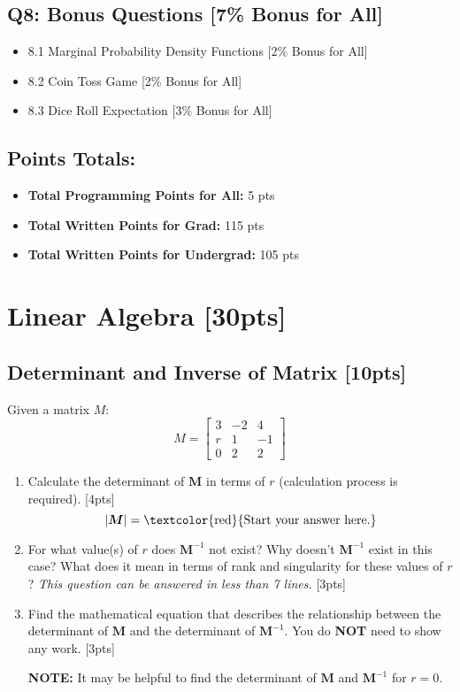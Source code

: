 \documentclass{article}
\begin{document}
\subsection*{Q8: Bonus Questions [7\% Bonus for All]}
\begin{itemize}
    \item 8.1 Marginal Probability Density Functions [2\% Bonus for All]
    \item 8.2 Coin Toss Game [2\% Bonus for All]
    \item 8.3 Dice Roll Expectation [3\% Bonus for All]
\end{itemize}

\subsection*{Points Totals:}
\begin{itemize}
    \item \textbf{Total Programming Points for All:} 5 pts
    \item \textbf{Total Written Points for Grad:} 115 pts
    \item \textbf{Total Written Points for Undergrad:} 105 pts
\end{itemize}


\newpage

\section{Linear Algebra [30pts]}
\subsection{Determinant and Inverse of Matrix [10pts]}
Given a matrix $M$:
$$M = \begin{bmatrix} 
    3 & -2 & 4 \\ 
    r & 1 & -1 \\
    0 & 2 & 2
\end{bmatrix}$$
\begin{enumerate}[label=(\alph*)]
    \item Calculate the determinant of $\boldsymbol{M}$ in terms of $r$ (calculation process is required). [4pts]
    $$|\boldsymbol{M}| = \text{\textcolor{red}{Start your answer here.}} $$

    \item For what value(s) of $r$ does $\boldsymbol{M}^{-1}$ not exist? Why doesn't $\boldsymbol{M}^{-1}$ exist in this case? What does it mean in terms of rank and singularity for these values of $r$? \textit{This question can be answered in less than 7 lines. } [3pts]
        
    \item Find the mathematical equation that describes the relationship between the determinant of $\boldsymbol{M}$ and the determinant of $\boldsymbol{M}^{-1}$. You do \textbf{NOT} need to show any work. [3pts]
    \par\textbf{NOTE:} It may be helpful to find the determinant of $\boldsymbol{M}$ and $\boldsymbol{M}^{-1}$ for $r = 0$.

\end{enumerate}
\end{document}
